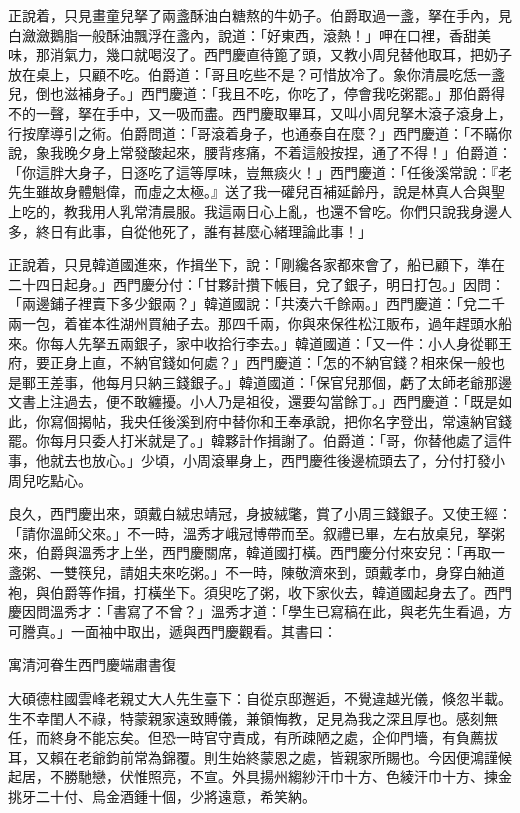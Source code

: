 正說着，只見畫童兒拏了兩盞酥油白糖熬的牛奶子。伯爵取過一盞，拏在手內，見白瀲瀲鵝脂一般酥油飄浮在盞內，說道：「好東西，滾熱！」呷在口裡，香甜美味，那消氣力，幾口就喝沒了。西門慶直待篦了頭，又教小周兒替他取耳，把奶子放在桌上，只顧不吃。伯爵道：「哥且吃些不是？可惜放冷了。象你清晨吃恁一盞兒，倒也滋補身子。」西門慶道：「我且不吃，你吃了，停會我吃粥罷。」那伯爵得不的一聲，拏在手中，又一吸而盡。{}西門慶取畢耳，又叫小周兒拏木滾子滾身上，行按摩導引之術。伯爵問道：「哥滾着身子，也通泰自在麼？」西門慶道：「不瞞你說，象我晚夕身上常發酸起來，腰背疼痛，不着這般按捏，通了不得！」伯爵道：「你這胖大身子，日逐吃了這等厚味，豈無痰火！」西門慶道：「任後溪常說：『老先生雖故身體魁偉，而虛之太極。』送了我一礶兒百補延齡丹，說是林真人合與聖上吃的，教我用人乳常清晨服。我這兩日心上亂，也還不曾吃。你們只說我身邊人多，終日有此事，自從他死了，誰有甚麼心緒理論此事！」{}

正說着，只見韓道國進來，作揖坐下，說：「剛纔各家都來會了，船已顧下，準在二十四日起身。」西門慶分付：「甘夥計攢下帳目，兌了銀子，明日打包。」因問：「兩邊鋪子裡賣下多少銀兩？」韓道國說：「共湊六千餘兩。」西門慶道：「兌二千兩一包，着崔本徃湖州買紬子去。那四千兩，你與來保徃松江販布，過年趕頭水船來。你每人先拏五兩銀子，家中收拾行李去。」韓道國道：「又一件：小人身從鄆王府，要正身上直，不納官錢如何處？」西門慶道：「怎的不納官錢？相來保一般也是鄆王差事，他每月只納三錢銀子。」韓道國道：「保官兒那個，虧了太師老爺那邊文書上注過去，便不敢纏擾。小人乃是祖役，還要勾當餘丁。」西門慶道：「既是如此，你寫個揭帖，我央任後溪到府中替你和王奉承說，把你名字登出，常遠納官錢罷。你每月只委人打米就是了。」韓夥計作揖謝了。伯爵道：「哥，你替他處了這件事，他就去也放心。」少頃，小周滾畢身上，西門慶徃後邊梳頭去了，分付打發小周兒吃點心。

良久，西門慶出來，頭戴白絨忠靖冠，身披絨氅，賞了小周三錢銀子。又使王經：「請你溫師父來。」不一時，溫秀才峨冠博帶而至。叙禮已畢，左右放桌兒，拏粥來，伯爵與溫秀才上坐，西門慶關席，韓道國打橫。西門慶分付來安兒：「再取一盞粥、一雙筷兒，請姐夫來吃粥。」不一時，陳敬濟來到，頭戴孝巾，身穿白紬道袍，與伯爵等作揖，打橫坐下。須臾吃了粥，收下家伙去，韓道國起身去了。西門慶因問溫秀才：「書寫了不曾？」溫秀才道：「學生已寫稿在此，與老先生看過，方可謄真。」一面袖中取出，遞與西門慶觀看。其書曰：

\begin{myquote}[\markfont]
寓清河眷生西門慶端肅書復

大碩德柱國雲峰老親丈大人先生臺下：自從京邸邂逅，不覺違越光儀，倏忽半載。生不幸閨人不祿，特蒙親家遠致賻儀，兼領悔教，足見為我之深且厚也。感刻無任，而終身不能忘矣。但恐一時官守責成，有所疎陋之處，企仰門墻，有負薦拔耳，又賴在老爺鈞前常為錦覆。則生始終蒙恩之處，皆親家所賜也。今因便鴻謹候起居，不勝馳戀，伏惟照亮，不宣。外具揚州縐紗汗巾十方、色綾汗巾十方、揀金挑牙二十付、烏金酒鍾十個，少將遠意，希笑納。
\end{myquote}

